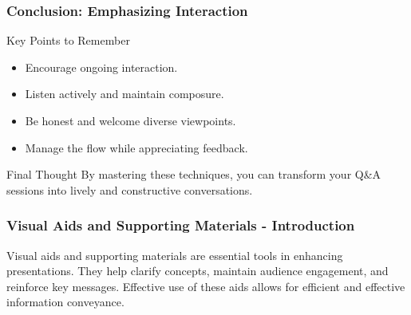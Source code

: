 \documentclass{beamer}
\begin{document}
\begin{frame}[fragile]
    \frametitle{Conclusion: Emphasizing Interaction}
    \begin{block}{Key Points to Remember}
        \begin{itemize}
            \item Encourage ongoing interaction.
            \item Listen actively and maintain composure.
            \item Be honest and welcome diverse viewpoints.
            \item Manage the flow while appreciating feedback.
        \end{itemize}
    \end{block}
    \begin{block}{Final Thought}
        By mastering these techniques, you can transform your Q\&A sessions into lively and constructive conversations.
    \end{block}
\end{frame}

\begin{frame}[fragile]
    \frametitle{Visual Aids and Supporting Materials - Introduction}
    Visual aids and supporting materials are essential tools in enhancing presentations. 
    They help clarify concepts, maintain audience engagement, and reinforce key messages. 
    Effective use of these aids allows for efficient and effective information conveyance.
\end{frame}
\end{document}
